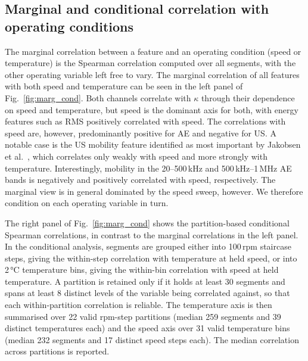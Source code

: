 \subsection{Marginal and conditional correlation with operating conditions}
\label{subsec:confound}

The marginal correlation between a feature and an operating condition (speed or temperature) is the Spearman correlation computed over all segments, with the other operating variable left free to vary. The marginal correlation of all features with both speed and temperature can be seen in the left panel of Fig.~\ref{fig:marg_cond}. Both channels correlate with $\kappa$ through their dependence on speed and temperature, but speed is the dominant axis for both, with energy features such as RMS positively correlated with speed. The correlations with speed are, however, predominantly positive for AE and negative for US. A notable case is the US mobility feature identified as most important by Jakobsen et al.~\cite{jakobsen_detecting_2023}, which correlates only weakly with speed and more strongly with temperature. Interestingly, mobility in the 20--500\,kHz and 500\,kHz--1\,MHz AE bands is negatively and positively correlated with speed, respectively. The marginal view is in general dominated by the speed sweep, however. We therefore condition on each operating variable in turn.

The right panel of Fig.~\ref{fig:marg_cond} shows the partition-based conditional Spearman correlations, in contrast to the marginal correlations in the left panel. In the conditional analysis, segments are grouped either into 100\,rpm staircase steps, giving the within-step correlation with temperature at held speed, or into 2\,\si{\celsius} temperature bins, giving the within-bin correlation with speed at held temperature. A partition is retained only if it holds at least 30 segments and spans at least 8 distinct levels of the variable being correlated against, so that each within-partition correlation is reliable. The temperature axis is then summarised over 22 valid rpm-step partitions (median 259 segments and 39 distinct temperatures each) and the speed axis over 31 valid temperature bins (median 232 segments and 17 distinct speed steps each). The median correlation across partitions is reported.

